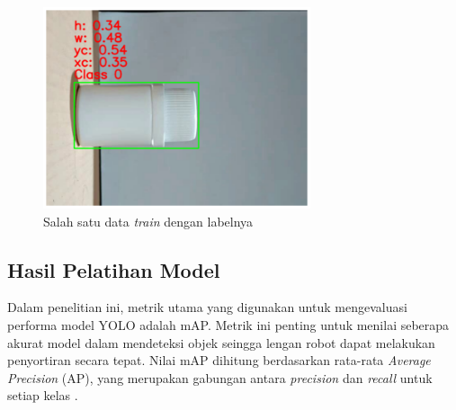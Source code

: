 \begin{figure}[H]
  \centering
  \includegraphics[width=0.7\textwidth]{gambar/anotasi.png}
  \caption{Salah satu data \textit{train} dengan labelnya}
  \label{fig:yolo-anotasi}
\end{figure}
\vspace{-1em}

\vspace{1em}

\subsection{Hasil Pelatihan Model}
Dalam penelitian ini, metrik utama yang digunakan untuk mengevaluasi
performa model YOLO adalah mAP. Metrik ini penting untuk menilai
seberapa akurat model dalam mendeteksi objek
seingga lengan robot dapat melakukan penyortiran secara tepat. Nilai
mAP dihitung berdasarkan rata-rata \textit{Average Precision} (AP), yang
merupakan gabungan antara \textit{precision} dan \textit{recall}
untuk setiap kelas \citep{21}.

